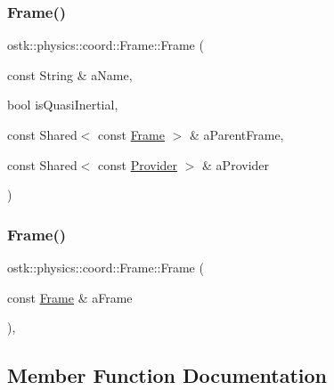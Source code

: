 \subsubsection{\texorpdfstring{Frame()}{Frame()}\hspace{0.1cm}{\footnotesize\ttfamily [1/2]}}
{\footnotesize\ttfamily ostk\+::physics\+::coord\+::\+Frame\+::\+Frame (\begin{DoxyParamCaption}\item[{const String \&}]{a\+Name,  }\item[{bool}]{is\+Quasi\+Inertial,  }\item[{const Shared$<$ const \hyperlink{classostk_1_1physics_1_1coord_1_1_frame}{Frame} $>$ \&}]{a\+Parent\+Frame,  }\item[{const Shared$<$ const \hyperlink{classostk_1_1physics_1_1coord_1_1frame_1_1_provider}{Provider} $>$ \&}]{a\+Provider }\end{DoxyParamCaption})\hspace{0.3cm}{\ttfamily [protected]}}

\mbox{\label{classostk_1_1physics_1_1coord_1_1_frame_acaa7ddfcad1566838ca72bf431a3bd4f}} 
\subsubsection{\texorpdfstring{Frame()}{Frame()}\hspace{0.1cm}{\footnotesize\ttfamily [2/2]}}
{\footnotesize\ttfamily ostk\+::physics\+::coord\+::\+Frame\+::\+Frame (\begin{DoxyParamCaption}\item[{const \hyperlink{classostk_1_1physics_1_1coord_1_1_frame}{Frame} \&}]{a\+Frame }\end{DoxyParamCaption})\hspace{0.3cm}{\ttfamily [protected]}, {\ttfamily [default]}}



\subsection{Member Function Documentation}
\mbox{\label{classostk_1_1physics_1_1coord_1_1_frame_af2276e1ed3a74752194ae3414b10636d}} 
